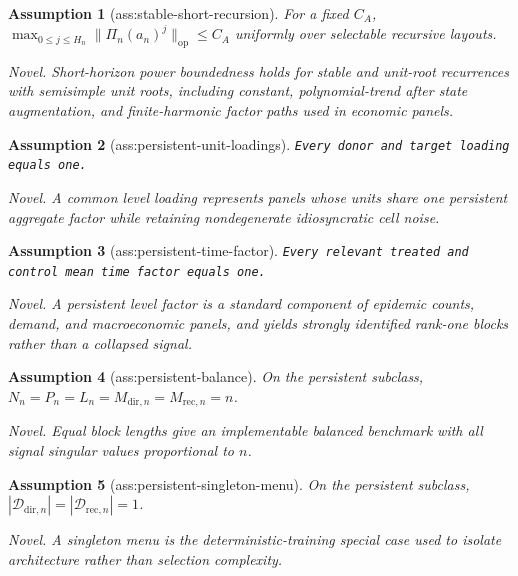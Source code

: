 \documentclass{article}
\newtheorem{assumption}{Assumption}
\begin{document}
\begin{assumption}[ass:stable-short-recursion]\label{ass:stable-short-recursion}
For a fixed \(C_A\), \(\max_{0\le j\le H_n}\|\Pi_n(a_n)^j\|_{\mathrm{op}}\le C_A\) uniformly over selectable recursive layouts.
\par\smallskip\noindent\emph{Novel.} Short-horizon power boundedness holds for stable and unit-root recurrences with semisimple unit roots, including constant, polynomial-trend after state augmentation, and finite-harmonic factor paths used in economic panels.
\end{assumption}

\begin{assumption}[ass:persistent-unit-loadings]\label{ass:persistent-unit-loadings}
\texttt{Every donor and target loading equals one.}
\par\smallskip\noindent\emph{Novel.} A common level loading represents panels whose units share one persistent aggregate factor while retaining nondegenerate idiosyncratic cell noise.
\end{assumption}

\begin{assumption}[ass:persistent-time-factor]\label{ass:persistent-time-factor}
\texttt{Every relevant treated and control mean time factor equals one.}
\par\smallskip\noindent\emph{Novel.} A persistent level factor is a standard component of epidemic counts, demand, and macroeconomic panels, and yields strongly identified rank-one blocks rather than a collapsed signal.
\end{assumption}

\begin{assumption}[ass:persistent-balance]\label{ass:persistent-balance}
On the persistent subclass, \(N_n=P_n=L_n=M_{\mathrm{dir},n}=M_{\mathrm{rec},n}=n\).
\par\smallskip\noindent\emph{Novel.} Equal block lengths give an implementable balanced benchmark with all signal singular values proportional to \(n\).
\end{assumption}

\begin{assumption}[ass:persistent-singleton-menu]\label{ass:persistent-singleton-menu}
On the persistent subclass, \(|\mathcal D_{\mathrm{dir},n}|=|\mathcal D_{\mathrm{rec},n}|=1\).
\par\smallskip\noindent\emph{Novel.} A singleton menu is the deterministic-training special case used to isolate architecture rather than selection complexity.
\end{assumption}
\end{document}
